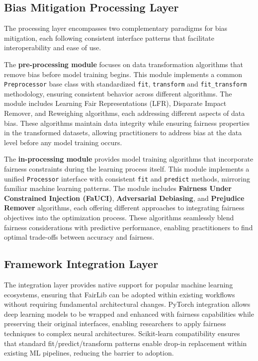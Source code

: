 \documentclass[12pt,a4paper,openright,twoside]{book}
\begin{document}
\subsection{Bias Mitigation Processing Layer}

The processing layer encompasses two complementary paradigms for bias mitigation, each following consistent interface patterns that facilitate interoperability and ease of use.

The \textbf{pre-processing module} focuses on data transformation algorithms that remove bias before model training begins. This module implements a common \texttt{Preprocessor} base class with standardized \texttt{fit}, \texttt{transform} and \texttt{fit\_transform} methodology, ensuring consistent behavior across different algorithms. The module includes Learning Fair Representations (LFR), Disparate Impact Remover, and Reweighing algorithms, each addressing different aspects of data bias. These algorithms maintain data integrity while ensuring fairness properties in the transformed datasets, allowing practitioners to address bias at the data level before any model training occurs.

The \textbf{in-processing module} provides model training algorithms that incorporate fairness constraints during the learning process itself. This module implements a unified \texttt{Processor} interface with consistent \texttt{fit} and \texttt{predict} methods, mirroring familiar machine learning patterns. The module includes \textbf{Fairness Under Constrained Injection (FaUCI)}, \textbf{Adversarial Debiasing}, and \textbf{Prejudice Remover} algorithms, each offering different approaches to integrating fairness objectives into the optimization process. These algorithms seamlessly blend fairness considerations with predictive performance, enabling practitioners to find optimal trade-offs between accuracy and fairness.

\subsection{Framework Integration Layer}

The integration layer provides native support for popular machine learning ecosystems, ensuring that FairLib can be adopted within existing workflows without requiring fundamental architectural changes. PyTorch integration allows deep learning models to be wrapped and enhanced with fairness capabilities while preserving their original interfaces, enabling researchers to apply fairness techniques to complex neural architectures. Scikit-learn compatibility ensures that standard fit/predict/transform patterns enable drop-in replacement within existing ML pipelines, reducing the barrier to adoption.
\end{document}
